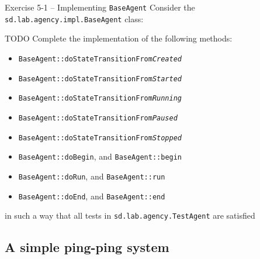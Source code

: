 \documentclass[presentation]{beamer}\mode<presentation>{\usetheme{AMSCesenaPurpleAndGold}}
\begin{document}
\begin{frame}[allowframebreaks]{Exercise 5-1 -- Implementing \texttt{BaseAgent}}
    Consider the \texttt{sd.lab.agency.impl.\alert{BaseAgent}} class:
    
    
    \framebreak
    
    \begin{block}{TODO}
        Complete the implementation of the following methods:
        \begin{itemize}
            \item \texttt{BaseAgent::\alert{doStateTransitionFrom\textit{Created}}}
            
            \item \texttt{BaseAgent::\alert{doStateTransitionFrom\textit{Started}}}
            
            \item \texttt{BaseAgent::\alert{doStateTransitionFrom\textit{Running}}}
            
            \item \texttt{BaseAgent::\alert{doStateTransitionFrom\textit{Paused}}}
            
            \item \texttt{BaseAgent::\alert{doStateTransitionFrom\textit{Stopped}}} 
            
            \item \texttt{BaseAgent::\alert{doBegin}}, and  \texttt{BaseAgent::\alert{begin}}
            
            \item \texttt{BaseAgent::\alert{doRun}}, and \texttt{BaseAgent::\alert{run}}
            
            \item \texttt{BaseAgent::\alert{doEnd}}, and \texttt{BaseAgent::\alert{end}}
        \end{itemize}
        in such a way that all tests in \texttt{sd.lab.agency.\alert{TestAgent}} are satisfied
    \end{block}
\end{frame}

\subsection{A simple ping-ping system}
\end{document}
